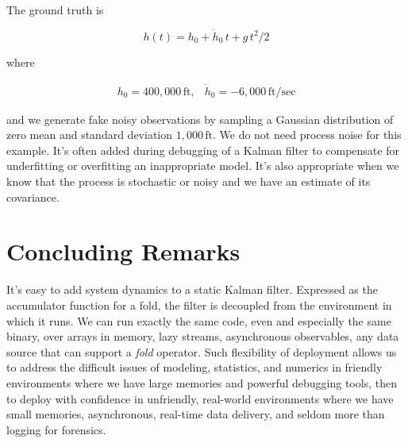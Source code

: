 \documentclass[10pt,oneside,x11names]{article}
\begin{document}
The ground truth is

\begin{equation*}
h(t) = h_0 + {\dot{h}}_0\,t + g\,t^2/2
\end{equation*}

\noindent where

\begin{equation*}
\begin{matrix}
h_0 = 400,000\,\textrm{ft}, & {\dot{h}}_0 = -6,000\,\textrm{ft}/\textrm{sec}
\end{matrix}
\end{equation*}

\noindent and we generate fake noisy observations by sampling a Gaussian
distribution of zero mean and standard deviation \(1,000\,\textrm{ft}\). We do not
need process noise for this example. It's often added during debugging of a
Kalman filter to compensate for underfitting or overfitting an inappropriate
model. It's also appropriate when we know that the process is stochastic or
noisy and we have an estimate of its covariance.

\section{Concluding Remarks}
\label{sec:orgheadline8}

It's easy to add system dynamics to a static Kalman filter. Expressed as the
accumulator function for a fold, the filter is decoupled from the environment in
which it runs. We can run exactly the same code, even and especially the same
binary, over arrays in memory, lazy streams, asynchronous observables, any data
source that can support a \emph{fold} operator. Such flexibility of deployment allows
us to address the difficult issues of modeling, statistics, and numerics in
friendly environments where we have large memories and powerful debugging tools,
then to deploy with confidence in unfriendly, real-world environments where we
have small memories, asynchronous, real-time data delivery, and seldom more than
logging for forensics.
\end{document}
